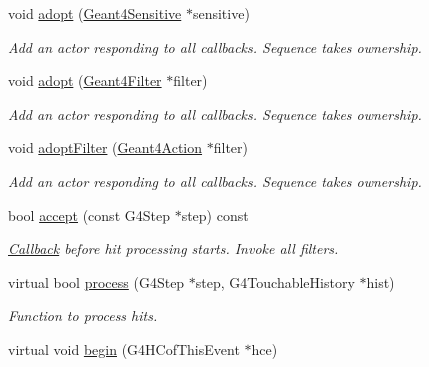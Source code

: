 \begin{DoxyCompactItemize}
void \hyperlink{class_d_d4hep_1_1_simulation_1_1_geant4_sens_det_action_sequence_a01437840682e0edbee69d11c99f73b5f}{adopt} (\hyperlink{class_d_d4hep_1_1_simulation_1_1_geant4_sensitive}{Geant4\+Sensitive} $\ast$sensitive)
\begin{DoxyCompactList}\small\item\em Add an actor responding to all callbacks. Sequence takes ownership. \end{DoxyCompactList}\item 
void \hyperlink{class_d_d4hep_1_1_simulation_1_1_geant4_sens_det_action_sequence_a89fcbc8c65a95890ea349087ac4834ec}{adopt} (\hyperlink{class_d_d4hep_1_1_simulation_1_1_geant4_filter}{Geant4\+Filter} $\ast$filter)
\begin{DoxyCompactList}\small\item\em Add an actor responding to all callbacks. Sequence takes ownership. \end{DoxyCompactList}\item 
void \hyperlink{class_d_d4hep_1_1_simulation_1_1_geant4_sens_det_action_sequence_ae387c8632412ef9eec6ed9767d3ea01b}{adopt\+Filter} (\hyperlink{class_d_d4hep_1_1_simulation_1_1_geant4_action}{Geant4\+Action} $\ast$filter)
\begin{DoxyCompactList}\small\item\em Add an actor responding to all callbacks. Sequence takes ownership. \end{DoxyCompactList}\item 
bool \hyperlink{class_d_d4hep_1_1_simulation_1_1_geant4_sens_det_action_sequence_aa3af85c443979428311f932af57473fd}{accept} (const G4\+Step $\ast$step) const
\begin{DoxyCompactList}\small\item\em \hyperlink{class_d_d4hep_1_1_callback}{Callback} before hit processing starts. Invoke all filters. \end{DoxyCompactList}\item 
virtual bool \hyperlink{class_d_d4hep_1_1_simulation_1_1_geant4_sens_det_action_sequence_a452bc5bf7c03c8b546d3459ba7bf7e36}{process} (G4\+Step $\ast$step, G4\+Touchable\+History $\ast$hist)
\begin{DoxyCompactList}\small\item\em Function to process hits. \end{DoxyCompactList}\item 
virtual void \hyperlink{class_d_d4hep_1_1_simulation_1_1_geant4_sens_det_action_sequence_a59c1e52c811f9385da294c0b18704ab1}{begin} (G4\+H\+Cof\+This\+Event $\ast$hce)

\end{DoxyCompactItemize}
